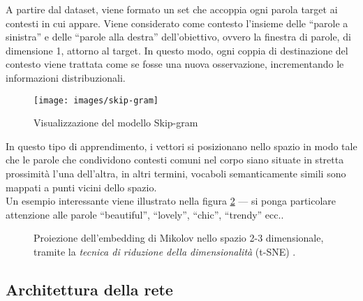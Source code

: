 A partire dal dataset, viene formato un set che accoppia ogni parola target ai contesti in cui appare. Viene considerato come contesto l'insieme delle ``parole a sinistra'' e delle ``parole alla destra'' dell'obiettivo, ovvero la finestra di parole, di dimensione 1, attorno al target. 
In questo modo, ogni coppia di destinazione del contesto viene trattata come se fosse una nuova osservazione, incrementando le informazioni distribuzionali.\\

\begin{figure}[htb]
	\centering
	{\texttt{[image: images/skip-gram]}} 
	\caption{Visualizzazione del modello Skip-gram}
	\label{fig:mikolov}
\end{figure}

In questo tipo di apprendimento, i vettori si posizionano nello spazio in modo tale che le parole che condividono contesti comuni nel corpo siano situate in stretta prossimità l'una dell'altra, in altri termini, vocaboli semanticamente simili sono mappati a punti vicini dello spazio.\\
Un esempio interessante viene illustrato nella figura \ref{fig:embedding1} --- si ponga particolare attenzione alle parole ``beautiful'', ``lovely'', ``chic'', ``trendy'' ecc..

\begin{figure}[htb]
	\centering
	\hspace{10mm}
	
	\caption{Proiezione dell'embedding di Mikolov nello spazio 2-3 dimensionale, tramite la \emph{tecnica di riduzione della dimensionalità} (t-SNE) \cite{FIXME}.}
	\label{fig:embedding1}
\end{figure}


\subsection{Architettura della rete}
\label{subsec:modelli2}







